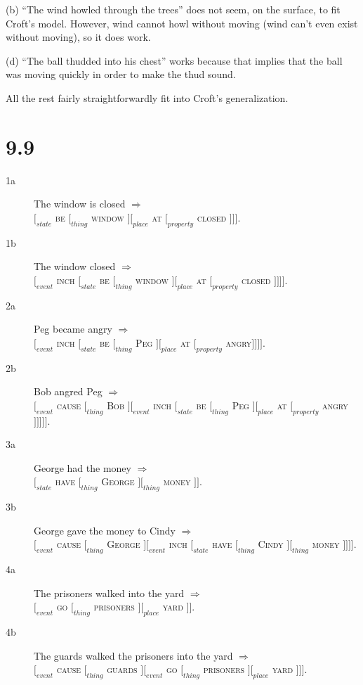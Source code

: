 \documentclass[12pt]{article}
\begin{document}
(b) ``The wind howled through the trees'' does not seem, on the surface,
to fit Croft's model.  However, wind cannot howl without moving (wind
can't even exist without moving), so it does work.

(d) ``The ball thudded into his chest'' works because that implies that
the ball was moving quickly in order to make the thud sound.

All the rest fairly straightforwardly fit into Croft's generalization.

\section*{9.9}

\begin{description}
\item[1a] The window is closed $\Rightarrow$ \\\textsc{$[_{state}$ be $[_{thing}$
window $] [_{place}$ at $[_{property}$ closed $]]]$}.
\item[1b] The window closed $\Rightarrow$ \\\textsc{$[_{event}$ inch
$[_{state}$ be $[_{thing}$ window $] [_{place}$ at $[_{property}$ closed
$]]]]$}.
\item[2a] Peg became angry $\Rightarrow$ \\\textsc{$[_{event}$ inch
$[_{state}$ be $[_{thing}$ Peg $] [_{place}$ at $[_{property}$
angry$]]]]$}.
\item[2b] Bob angred Peg $\Rightarrow$ \\\textsc{$[_{event}$ cause
$[_{thing}$ Bob $] [_{event} $ inch $[_{state}$ be $[_{thing}$ Peg $] [_{place}$ at
$[_{property}$ angry $]]]]]$}.
\item[3a] George had the money $\Rightarrow$ \\\textsc{$[_{state}$ have
$[_{thing}$ George $] [_{thing} $ money $ ]]$}.
\item[3b] George gave the money to Cindy $\Rightarrow$
\\\textsc{$[_{event}$ cause $[_{thing}$ George $] [_{event}$ inch
$[_{state}$ have $[_{thing}$ Cindy $] [_{thing}$ money $]]]]$}.
\item[4a] The prisoners walked into the yard $\Rightarrow$
\\\textsc{$[_{event}$ go $[_{thing}$ prisoners $] [_{place}$ yard $]]$}.
\item[4b] The guards walked the prisoners into the yard $\Rightarrow$
\\\textsc{$[_{event}$ cause $[_{thing}$ guards $] [_{event}$ go
$[_{thing}$ prisoners $] [_{place}$ yard $]]]$}.
\end{description}
\end{document}
